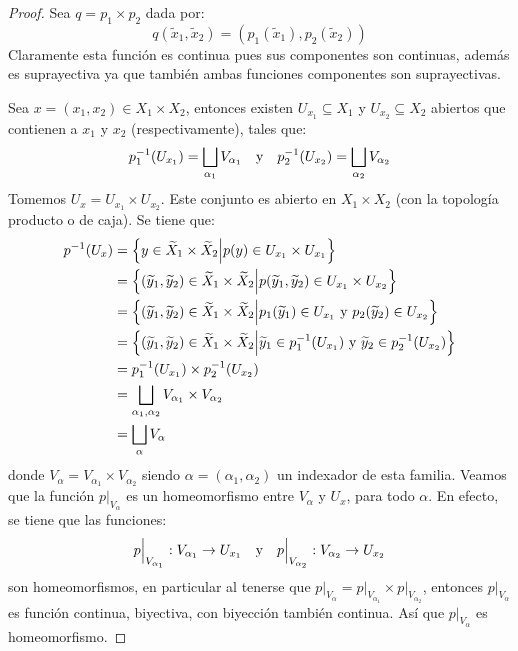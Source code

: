 \documentclass[12pt]{report}
\newcounter{it}
\theoremstyle{largebreak}
\newcommand\cf[3]{\ensuremath{#1:#2\rightarrow#3}}
\begin{document}
    \begin{proof}
        Sea $q=p_1\times p_2$ dada por:
        \begin{equation*}
            q(\widetilde{x}_1,\widetilde{x}_2)=(p_1(\widetilde{x}_1),p_2(\widetilde{x}_2))
        \end{equation*}
        Claramente esta función es continua pues sus componentes son continuas, además es suprayectiva ya que también ambas funciones componentes son suprayectivas.
        
        Sea $x=(x_1,x_2)\in X_1\times X_2$, entonces existen $U_{ x_1}\subseteq X_1$ y $U_{ x_2}\subseteq X_2$ abiertos que contienen a $x_1$ y $x_2$ (respectivamente), tales que:
        \begin{equation*}
            p_1^{-1}(U_{ x_1})=\bigsqcup_{\alpha_1}V_{\alpha_1}\quad\textup{y}\quad p_2^{-1}(U_{ x_2})=\bigsqcup_{\alpha_2}V_{\alpha_2}
        \end{equation*}
        Tomemos $U_{x}=U_{x_1}\times U_{x_2}$. Este conjunto es abierto en $X_1\times X_2$ (con la topología producto o de caja). Se tiene que:
        \begin{equation*}
            \begin{split}
                p^{-1}(U_x)&=\left\{y\in\widetilde{X}_1\times\widetilde{X}_2\Big|p(y)\in U_{x_1}\times U_{x_1} \right\}\\
                &=\left\{(\widetilde{y}_1,\widetilde{y}_2)\in\widetilde{X}_1\times\widetilde{X}_2\Big|p(\widetilde{y}_1,\widetilde{y}_2)\in U_{x_1}\times U_{x_2} \right\}\\
                &=\left\{(\widetilde{y}_1,\widetilde{y}_2)\in\widetilde{X}_1\times\widetilde{X}_2\Big|p_1(\widetilde{y}_1)\in U_{x_1}\textup{ y }p_2(\widetilde{y}_2)\in U_{x_2} \right\}\\
                &=\left\{(\widetilde{y}_1,\widetilde{y}_2)\in\widetilde{X}_1\times\widetilde{X}_2\Big|\widetilde{y}_1\in p_1^{-1}(U_{x_1})\textup{ y }\widetilde{y}_2\in p_2^{-1}(U_{x_2}) \right\}\\
                &=p_1^{-1}(U_{x_1})\times p_2^{-1}(U_{x_2})\\
                &=\bigsqcup_{\alpha_1,\alpha_2}V_{\alpha_1}\times V_{\alpha_2}\\
                &=\bigsqcup_{\alpha}V_\alpha
            \end{split}
        \end{equation*}
        donde $V_\alpha=V_{\alpha_1}\times V_{\alpha_2}$ siendo $\alpha=(\alpha_1,\alpha_2)$ un indexador de esta familia. Veamos que la función $p\Big|_{V_\alpha}$ es un homeomorfismo entre $V_\alpha$ y $U_x$, para todo $\alpha$. En efecto, se tiene que las funciones:
        \begin{equation*}
            \cf{p\Big|_{ V_{\alpha_1}}}{V_{\alpha_1}}{U_{ x_1}}\quad\textup{y}\quad \cf{p\Big|_{ V_{\alpha_2}}}{V_{\alpha_2}}{U_{ x_2}}
        \end{equation*}
        son homeomorfismos, en particular al tenerse que $p\Big|_{V_\alpha}=p\Big|_{ V_{\alpha_1}}\times p\Big|_{ V_{\alpha_2}}$, entonces $p\Big|_{V_\alpha}$ es función continua, biyectiva, con biyección también continua. Así que $p\Big|_{V_\alpha}$ es homeomorfismo.


\end{proof}
\end{document}
